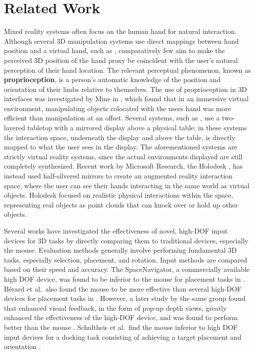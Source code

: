 \section{Related Work}\label{sec:related}
Mixed reality systems often focus on the human hand for natural interaction.
Although several 3D manipulation systems use direct mappings between hand
position and a virtual hand, such as \cite{poupyrev1996go},
comparatively few aim to make the perceived 3D position of the hand proxy be
coincident with the user's natural perception of their
hand location. The relevant perceptual phenomenon, known as {\bf
proprioception}, is a person's automatic knowledge of the position and
orientation of their
limbs relative to themselves. The use of proprioception in 3D interfaces was
investigated by Mine in \cite{mine1997exploiting}, which found that
in an immersive virtual environment, manipulating objects colocated with the
users hand was more efficient than manipulation at an offset. Several systems,
such as \cite{mulder2002personal, prachyabrued2011dropping}, use a two-layered
tabletop with a mirrored display above a physical table; in these systems the
interaction space, underneath
the display and above the table, is directly mapped to what the user sees in the
display. The aforementioned systems are strictly virtual reality systems, since
the actual environments displayed
are still completely synthesized. Recent work by Microsoft Research, the
Holodesk \cite{holodesk}, has instead used half-silvered mirrors to create an
augmented reality
interaction space, where the user can see their hands interacting in the same
world as virtual objects. Holodesk focused on realistic physical interactions
within the space,
representing real objects as point clouds that can knock over or hold up other
objects.

Several works have investigated the effectiveness of novel, high-DOF input
devices for 3D tasks by directly comparing them to traditional devices,
especially the mouse.
Evaluation methods generally involve performing fundamental 3D tasks, especially
selection, placement, and rotation. Input methods are compared based on their
speed and accuracy. The SpaceNavigator, a commercially available high DOF
device, was found to be inferior to the mouse for placement tasks in
\cite{mattheiss2011navigating}. B{\'e}rard et al.\ also found the mouse to be more
effective than several high-DOF devices for placement tasks
in \cite{study1}.  However, a later study by the same group found that enhanced
visual feedback, in the form of pop-up depth views, greatly enhanced the
effectiveness
of the high-DOF device, and was found to perform better than the mouse
\cite{study2}. Schultheis et al.\ find the mouse inferior to high DOF input devices
for a docking task consisting of achieving a target placement and orientation
\cite{schultheis2012comparison}.


